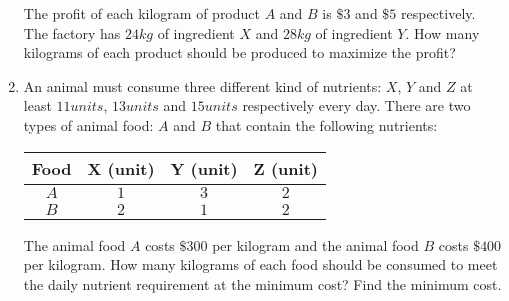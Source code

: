 \documentclass{report}
\begin{document}
\begin{multicols}{2}
\begin{enumerate}
              The profit of each kilogram of product $A$ and $B$ is $\$3$ and $\$5$
              respectively. The factory has $24kg$ of ingredient $X$ and $28kg$ of ingredient
              $Y$. How many kilograms of each product should be produced to maximize the
              profit?

        \item An animal must consume three different kind of nutrients: $X$, $Y$ and $Z$ at
              least $11 units$, $13 units$ and $15 units$ respectively every day. There are
              two types of animal food: $A$ and $B$ that contain the following nutrients:

              \begin{center}
                  \begin{tabular}{|c|c|c|c|}
                      \hline
                      \textbf{Food} & \textbf{X (unit)} & \textbf{Y (unit)} & \textbf{Z (unit)} \\
                      \hline
                      $A$           & $1$               & $3$               & $2$               \\
                      $B$           & $2$               & $1$               & $2$               \\
                      \hline
                  \end{tabular}
              \end{center}

              The animal food $A$ costs $\$300$ per kilogram and the animal food $B$ costs
              $\$400$ per kilogram. How many kilograms of each food should be consumed to
              meet the daily nutrient requirement at the minimum cost? Find the minimum cost.
    \end{enumerate}

\end{multicols}
\end{document}
